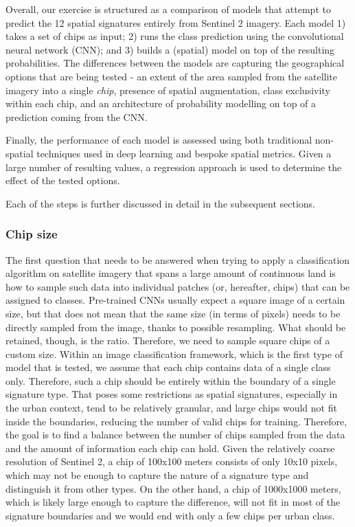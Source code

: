Overall, our exercise is structured as a comparison of models that attempt to
predict the 12 spatial signatures entirely from Sentinel 2 imagery. Each model 1) takes
a set of chips as input; 2) runs the class prediction using the convolutional neural
network (CNN); and 3) builds a (spatial) model on top of the resulting probabilities. The
differences between the models are capturing the geographical options that are being tested - an
extent of the area sampled from the satellite imagery into a single \textit{chip},
presence of spatial augmentation, class exclusivity within each chip, and an
architecture of probability modelling on top of a prediction coming from the CNN.

Finally, the performance of each model is assessed using both traditional non-spatial
techniques used in deep learning and bespoke spatial metrics. Given a large number of
resulting values, a regression approach is used to determine the effect of the tested
options.

Each of the steps is further discussed in detail in the subsequent sections.

\subsubsection{Chip size}


The first question that needs to be answered when trying to apply a classification
algorithm on satellite imagery that spans a large amount of continuous land is how
to sample such data into individual patches (or, hereafter, chips)
that can be assigned to classes. Pre-trained CNNs usually expect a square image of
a certain size, but that does not mean that the same size (in terms of pixels) needs to
be directly sampled from the image, thanks to possible resampling. What should be
retained, though, is the ratio. Therefore, we need to sample square chips of a
custom size. Within an image classification framework, which is the first type of model that is tested, we assume that
each chip contains data of a single class only. Therefore, such a chip should be entirely
within the boundary of a single signature type. That poses some restrictions as spatial
signatures, especially in the urban context, tend to be relatively granular, and large chips
would not fit inside the boundaries, reducing the number of
valid chips for training. Therefore, the goal is to find a balance
between the number of chips sampled from the data and the amount of
information each chip can hold. Given the relatively coarse resolution of Sentinel 2, a
chip of 100x100 meters consists of only 10x10 pixels, which may not be enough to capture
the nature of a signature type and distinguish it from other types. On the other hand, a
chip of 1000x1000 meters, which is likely large enough to capture the difference, will
not fit in most of the signature boundaries and we would end with only a few chips per
urban class.

